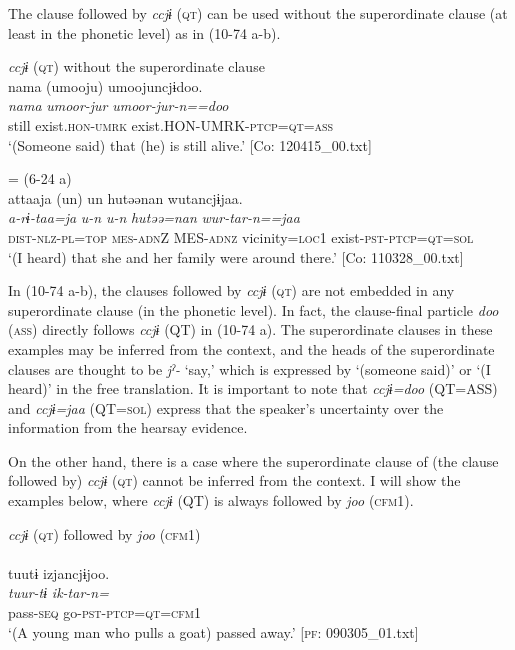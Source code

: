 The clause followed by \textit{ccjɨ} (\textsc{qt}) can be used without the superordinate clause (at least in the phonetic level) as in (10-74 a-b).

\ea\label{ex:10.74}   \textit{ccjɨ} (\textsc{qt}) without the superordinate clause\\
  \ea  %
      \glll    nama  (umooju)  umoojuncjɨdoo.\\
      \textit{nama}  \textit{umoor-jur}  \textit{umoor-jur-n==doo}\\
      still  exist.\textsc{hon}-\textsc{umrk}  exist.HON-UMRK-\textsc{ptcp}=\textsc{qt}=\textsc{ass}\\
      \glt       ‘(Someone said) that (he) is still alive.’ [Co: 120415\_00.txt]

  \ex{} = (6-24 a)\\
      \glll    attaaja  (un)  un  hutəənan   wutancjɨjaa.\\
      \textit{a-rɨ-taa=ja}  \textit{u-n}  \textit{u-n}  \textit{hutəə=nan} \textit{wur-tar-n==jaa}\\
      \textsc{dist}-\textsc{nlz}-\textsc{pl}=\textsc{top}  \textsc{mes}-\textsc{adn}Z  MES-\textsc{adnz}  vicinity=\textsc{loc}1 exist-\textsc{pst}-\textsc{ptcp}=\textsc{qt}=\textsc{sol}\\
      \glt       ‘(I heard) that she and her family were around there.’ [Co: 110328\_00.txt]
    \z
\z

In (10-74 a-b), the clauses followed by \textit{ccjɨ} (\textsc{qt}) are not embedded in any superordinate clause (in the phonetic level). In fact, the clause-final particle \textit{doo} (\textsc{ass}) directly follows \textit{ccjɨ} (QT) in (10-74 a). The superordinate clauses in these examples may be inferred from the context, and the heads of the superordinate clauses are thought to be \textit{jˀ-} ‘say,’ which is expressed by ‘(someone said)’ or ‘(I heard)’ in the free translation. It is important to note that \textit{ccjɨ=doo} (QT=ASS) and \textit{ccjɨ=jaa} (QT=\textsc{sol}) express that the speaker’s uncertainty over the information from the hearsay evidence.

  On the other hand, there is a case where the superordinate clause of (the clause followed by) \textit{ccjɨ} (\textsc{qt}) cannot be inferred from the context. I will show the examples below, where \textit{ccjɨ} (QT) is always followed by \textit{joo} (\textsc{cfm}1).

\ea\label{ex:10.75}   \textit{ccjɨ} (\textsc{qt}) followed by \textit{joo} (\textsc{cfm}1)\\
  \ea{}\\
      \glll    tuutɨ  izjancjɨjoo.\\
      \textit{tuur-tɨ}  \textit{ik-tar-n=}\\
      pass-\textsc{seq}  go-\textsc{pst}-\textsc{ptcp}=\textsc{qt}=\textsc{cfm}1\\
      \glt       ‘(A young man who pulls a goat) passed away.’ [\textsc{pf}: 090305\_01.txt]

